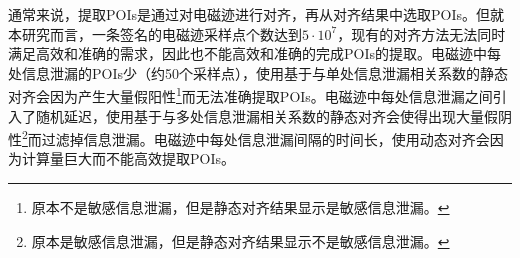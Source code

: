 {	
%	
%	
	
	通常来说，提取POIs是通过对电磁迹进行对齐，再从对齐结果中选取POIs。但就本研究而言，一条签名的电磁迹采样点个数达到$5\cdot10^{7}$，现有的对齐方法无法同时满足高效和准确的需求，因此也不能高效和准确的完成POIs的提取。电磁迹中每处信息泄漏的POIs少（约50个采样点），使用基于与单处信息泄漏相关系数的静态对齐会因为产生大量假阳性\footnote{原本不是敏感信息泄漏，但是静态对齐结果显示是敏感信息泄漏。}而无法准确提取POIs。电磁迹中每处信息泄漏之间引入了随机延迟，使用基于与多处信息泄漏相关系数的静态对齐会使得出现大量假阴性\footnote{原本是敏感信息泄漏，但是静态对齐结果显示不是敏感信息泄漏。}而过滤掉信息泄漏。电磁迹中每处信息泄漏间隔的时间长，使用动态对齐会因为计算量巨大而不能高效提取POIs。
	
}
